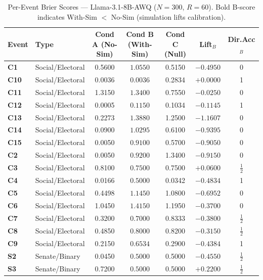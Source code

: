 \documentclass[11pt,journal,onecolumn]{IEEEtran}
\begin{document}
\begin{table}[!htbp]
\centering
\caption{Per-Event Brier Scores --- Llama-3.1-8B-AWQ ($N=300$, $R=60$). Bold B-score indicates With-Sim $<$ No-Sim (simulation lifts calibration).}
\label{tab:per_event_llama_8b}
\small
\setlength{\tabcolsep}{4pt}
\begin{tabular}{llccccc}
\toprule
\textbf{Event} & \textbf{Type} & \textbf{Cond A (No-Sim)} & \textbf{Cond B (With-Sim)} & \textbf{Cond C (Null)} & \textbf{Lift$_B$} & \textbf{Dir.Acc$_B$} \\
\midrule
\textbf{C1} & Social/Electoral & 0.5600 & $1.0550$ & 0.5150 & $-0.4950$ & 0 \\
\textbf{C10} & Social/Electoral & 0.0036 & $0.0036$ & 0.2834 & $+0.0000$ & 1 \\
\textbf{C11} & Social/Electoral & 1.3150 & $1.3400$ & 0.7550 & $-0.0250$ & 0 \\
\textbf{C12} & Social/Electoral & 0.0005 & $0.1150$ & 0.1034 & $-0.1145$ & 1 \\
\textbf{C13} & Social/Electoral & 0.2273 & $1.3880$ & 1.2500 & $-1.1607$ & 0 \\
\textbf{C14} & Social/Electoral & 0.0900 & $1.0295$ & 0.6100 & $-0.9395$ & 0 \\
\textbf{C15} & Social/Electoral & 0.0050 & $0.9100$ & 0.5700 & $-0.9050$ & 0 \\
\textbf{C2} & Social/Electoral & 0.0050 & $0.9200$ & 1.3400 & $-0.9150$ & 0 \\
\textbf{C3} & Social/Electoral & 0.8100 & $\mathbf{0.7500}$ & 0.7500 & $\mathbf{+0.0600}$ & $\frac{1}{2}$ \\
\textbf{C4} & Social/Electoral & 0.0166 & $0.5000$ & 0.0342 & $-0.4834$ & 1 \\
\textbf{C5} & Social/Electoral & 0.4498 & $1.1450$ & 1.0800 & $-0.6952$ & 0 \\
\textbf{C6} & Social/Electoral & 1.0450 & $1.4150$ & 1.1950 & $-0.3700$ & 0 \\
\textbf{C7} & Social/Electoral & 0.3200 & $0.7000$ & 0.8333 & $-0.3800$ & $\frac{1}{2}$ \\
\textbf{C8} & Social/Electoral & 0.4850 & $0.8000$ & 0.8200 & $-0.3150$ & $\frac{1}{2}$ \\
\textbf{C9} & Social/Electoral & 0.2150 & $0.6534$ & 0.2900 & $-0.4384$ & 1 \\
\textbf{S2} & Senate/Binary & 0.0450 & $0.5000$ & 0.5000 & $-0.4550$ & $\frac{1}{2}$ \\
\textbf{S3} & Senate/Binary & 0.7200 & $\mathbf{0.5000}$ & 0.5000 & $\mathbf{+0.2200}$ & $\frac{1}{2}$ \\

\end{tabular}
\end{table}
\end{document}
